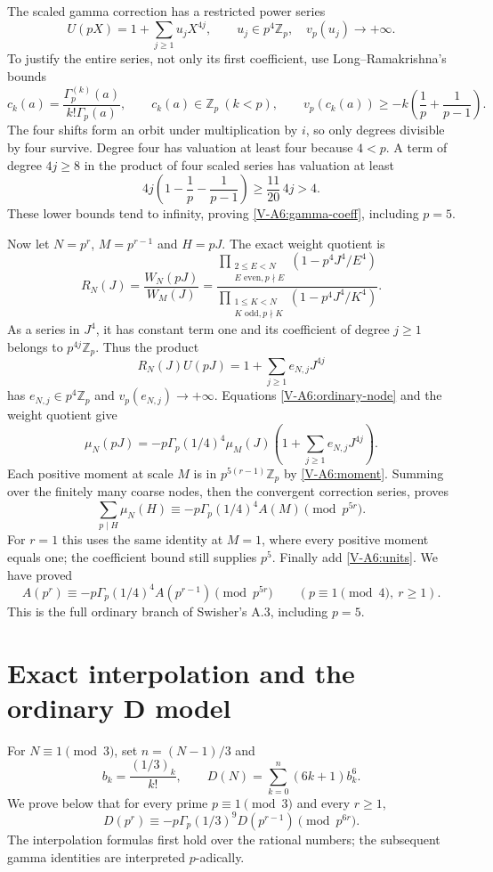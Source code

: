 \documentclass[11pt,letterpaper]{article}
\numberwithin{equation}{section}
\begin{document}
The scaled gamma correction has a restricted power series
\begin{equation}\label{V-A6:gamma-coeff}
U(pX)=1+\sum_{j\ge1}u_jX^{4j},\qquad
u_j\in p^4\mathbb Z_p,\quad v_p(u_j)\longrightarrow+\infty.
\end{equation}
To justify the entire series, not only its first coefficient, use
Long--Ramakrishna's bounds
\[
c_k(a)=\frac{\Gamma_p^{(k)}(a)}{k!\Gamma_p(a)},\qquad
c_k(a)\in\mathbb Z_p\ (k<p),\qquad
v_p(c_k(a))\ge-k\left(\frac1p+\frac1{p-1}\right).
\]
The four shifts form an orbit under multiplication by $i$, so only
degrees divisible by four survive. Degree four has valuation at
least four because $4<p$. A term of degree $4j\ge8$ in the product
of four scaled series has valuation at least
\[
4j\left(1-\frac1p-\frac1{p-1}\right)
\ge\frac{11}{20}\,4j>4.
\]
These lower bounds tend to infinity, proving \eqref{V-A6:gamma-coeff},
including $p=5$.

Now let $N=p^r$, $M=p^{r-1}$ and $H=pJ$. The exact weight quotient is
\[
R_N(J)=\frac{W_N(pJ)}{W_M(J)}
=\frac{\prod_{\substack{2\le E<N\\E\text{ even},p\nmid E}}
 (1-p^4J^4/E^4)}
{\prod_{\substack{1\le K<N\\K\text{ odd},p\nmid K}}
 (1-p^4J^4/K^4)}.
\]
As a series in $J^4$, it has constant term one and its coefficient
of degree $j\ge1$ belongs to $p^{4j}\mathbb Z_p$. Thus the product
\[
R_N(J)U(pJ)=1+\sum_{j\ge1}e_{N,j}J^{4j}
\]
has $e_{N,j}\in p^4\mathbb Z_p$ and $v_p(e_{N,j})\to+\infty$.
Equations \eqref{V-A6:ordinary-node} and the weight quotient give
\[
\mu_N(pJ)=-p\Gamma_p(1/4)^4\mu_M(J)
\left(1+\sum_{j\ge1}e_{N,j}J^{4j}\right).
\]
Each positive moment at scale $M$ is in $p^{5(r-1)}\mathbb Z_p$
by \eqref{V-A6:moment}. Summing over the finitely many coarse nodes,
then the convergent correction series, proves
\[
\sum_{p\mid H}\mu_N(H)
\equiv-p\Gamma_p(1/4)^4 A(M)\pmod{p^{5r}}.
\]
For $r=1$ this uses the same identity at $M=1$, where every positive
moment equals one; the coefficient bound still supplies $p^5$.
Finally add \eqref{V-A6:units}. We have proved
\begin{equation}\label{V-A6:ordinary-main}
\boxed{\quad A(p^r)\equiv-p\Gamma_p(1/4)^4 A(p^{r-1})
\pmod{p^{5r}}\qquad(p\equiv1\pmod4,\ r\ge1).\quad}
\end{equation}
This is the full ordinary branch of Swisher's A.3, including $p=5$.

\section{Exact interpolation and the ordinary D model}\label{loc-V-4}
\label{V-sec:d-ordinary-preliminaries}
For $N\equiv1\pmod3$, set $n=(N-1)/3$ and
\[
 b_k=\frac{(1/3)_k}{k!},\qquad
 D(N)=\sum_{k=0}^n(6k+1)b_k^6.
\]
We prove below that for every prime $p\equiv1\pmod3$ and every
$r\ge1$,
\[
 D(p^r)\equiv-p\Gamma_p(1/3)^9D(p^{r-1})\pmod{p^{6r}}.
\]
The interpolation formulas first hold over the rational numbers;
the subsequent gamma identities are interpreted $p$-adically.
\end{document}
